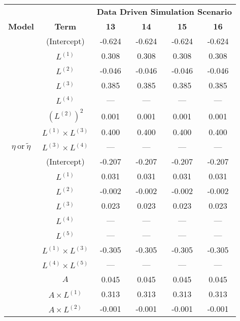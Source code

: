 \begin{sidewaystable}
    \footnotesize
\begin{minipage}[t]{0.5\textwidth}
\centering

\begin{tabular}[t]{>{}ccccc>{}c}
\hline
\multicolumn{1}{c}{\textbf{ }} & \multicolumn{1}{c}{\textbf{ }} & \multicolumn{4}{c}{\textbf{Data Driven Simulation Scenario}} \\
\cmidrule{3-6}
\textbf{Model} & \textbf{Term} & \textbf{13} & \textbf{14} & \textbf{15} & \textbf{16}\\
\hline
 & (Intercept) & -0.624 & -0.624 & -0.624 & -0.624\\
\cmidrule{2-6}
 & $L^{(1)}$ & 0.308 & 0.308 & 0.308 & 0.308\\
\cmidrule{2-6}
 & $L^{(2)}$ & -0.046 & -0.046 & -0.046 & -0.046\\
\cmidrule{2-6}
 & $L^{(3)}$ & 0.385 & 0.385 & 0.385 & 0.385\\
\cmidrule{2-6}
 & $L^{(4)}$ & --- & --- & --- & ---\\
\cmidrule{2-6}
 & $(L^{(2)})^2$ & 0.001 & 0.001 & 0.001 & 0.001\\
\cmidrule{2-6}
 & $L^{(1)} \times L^{(3)}$ & 0.400 & 0.400 & 0.400 & 0.400\\
\cmidrule{2-6}
\multirow{-8}{*}{\centering\arraybackslash $\eta~\text{or}~\tilde\eta$} & $L^{(3)} \times L^{(4)}$ & --- & --- & --- & ---\\
\cmidrule{1-6}
 & (Intercept) & -0.207 & -0.207 & -0.207 & -0.207\\
\cmidrule{2-6}
 & $L^{(1)}$ & 0.031 & 0.031 & 0.031 & 0.031\\
\cmidrule{2-6}
 & $L^{(2)}$ & -0.002 & -0.002 & -0.002 & -0.002\\
\cmidrule{2-6}
 & $L^{(3)}$ & 0.023 & 0.023 & 0.023 & 0.023\\
\cmidrule{2-6}
 & $L^{(4)}$ & --- & --- & --- & ---\\
\cmidrule{2-6}
 & $L^{(5)}$ & --- & --- & --- & ---\\
\cmidrule{2-6}
 & $L^{(1)} \times L^{(3)}$ & -0.305 & -0.305 & -0.305 & -0.305\\
\cmidrule{2-6}
 & $L^{(4)} \times L^{(5)}$ & --- & --- & --- & ---\\
\cmidrule{2-6}
 & $A$ & 0.045 & 0.045 & 0.045 & 0.045\\
\cmidrule{2-6}
 & $A \times L^{(1)}$ & 0.313 & 0.313 & 0.313 & 0.313\\
\cmidrule{2-6}
 & $A \times L^{(2)}$ & -0.001 & -0.001 & -0.001 & -0.001\\

\end{tabular}
\end{minipage}
\end{sidewaystable}
